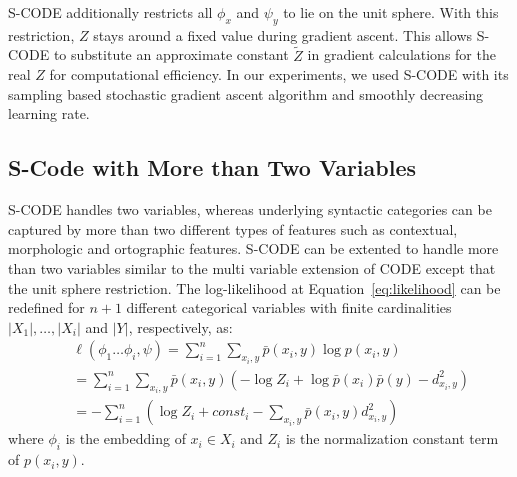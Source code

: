 S-CODE \cite{maron2010sphere} additionally restricts all $\phi_x$ and
$\psi_y$ to lie on the unit sphere.  With this restriction, $Z$ stays
around a fixed value during gradient ascent.  This allows S-CODE to
substitute an approximate constant $\tilde{Z}$ in gradient
calculations for the real $Z$ for computational efficiency.  In our
experiments, we used S-CODE with its sampling based stochastic
gradient ascent algorithm and smoothly decreasing learning
rate.

\subsection{S-Code with More than Two Variables}

S-CODE handles two variables, whereas underlying syntactic categories
can be captured by more than two different types of features such as
contextual, morphologic and ortographic features.  S-CODE can be
extented to handle more than two variables similar to the multi
variable extension of CODE \cite{globerson2007euclidean} except that
the unit sphere restriction.  The log-likelihood at
Equation~\ref{eq:likelihood} can be redefined for $n+1$ different
categorical variables with finite cardinalities $|X_1|,\hdots,|X_i|$
and $|Y|$, respectively, as:
\begin{eqnarray}
&&\ell(\phi_1 \hdots \phi_i, \psi) = \sum_{i=1}^n\sum_{x_i,y} \bar{p}(x_i,y) \log p(x_i,y) \label{eq:multilikelihood} \\
&&= \sum_{i=1}^n\sum_{x_i,y} \bar{p}(x_i,y) (-\log Z_i + \log \bar{p}(x_i)\bar{p}(y) - d^2_{x_i,y}) \nonumber \\
&&=-\sum_{i=1}^n(\log Z_i + \mathit{const}_i - \sum_{x_i,y} \bar{p}(x_i,y) d^2_{x_i,y}) \nonumber
\end{eqnarray}
where $\phi_i$ is the embedding of $x_i \in X_i$ and $Z_i$ is the
normalization constant term of $p(x_i,y)$.
